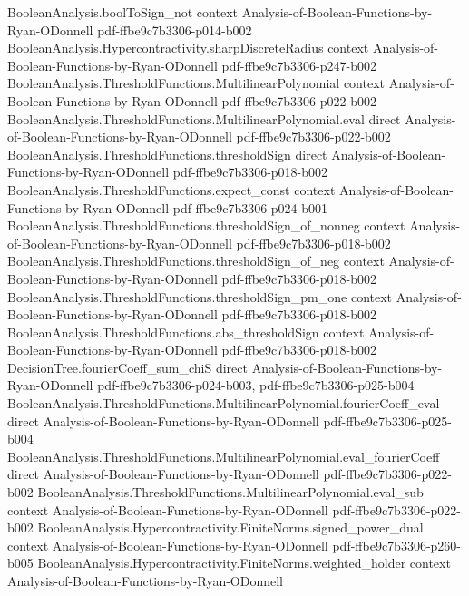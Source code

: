 \begin{theorem}
\proofstep
  {BooleanAnalysis.boolToSign_not}
  {context}
  {Analysis-of-Boolean-Functions-by-Ryan-ODonnell}
  {pdf-ffbe9c7b3306-p014-b002}
\proofstep
  {BooleanAnalysis.Hypercontractivity.sharpDiscreteRadius}
  {context}
  {Analysis-of-Boolean-Functions-by-Ryan-ODonnell}
  {pdf-ffbe9c7b3306-p247-b002}
\proofstep
  {BooleanAnalysis.ThresholdFunctions.MultilinearPolynomial}
  {context}
  {Analysis-of-Boolean-Functions-by-Ryan-ODonnell}
  {pdf-ffbe9c7b3306-p022-b002}
\proofstep
  {BooleanAnalysis.ThresholdFunctions.MultilinearPolynomial.eval}
  {direct}
  {Analysis-of-Boolean-Functions-by-Ryan-ODonnell}
  {pdf-ffbe9c7b3306-p022-b002}
\proofstep
  {BooleanAnalysis.ThresholdFunctions.thresholdSign}
  {direct}
  {Analysis-of-Boolean-Functions-by-Ryan-ODonnell}
  {pdf-ffbe9c7b3306-p018-b002}
\proofstep
  {BooleanAnalysis.ThresholdFunctions.expect_const}
  {context}
  {Analysis-of-Boolean-Functions-by-Ryan-ODonnell}
  {pdf-ffbe9c7b3306-p024-b001}
\proofstep
  {BooleanAnalysis.ThresholdFunctions.thresholdSign_of_nonneg}
  {context}
  {Analysis-of-Boolean-Functions-by-Ryan-ODonnell}
  {pdf-ffbe9c7b3306-p018-b002}
\proofstep
  {BooleanAnalysis.ThresholdFunctions.thresholdSign_of_neg}
  {context}
  {Analysis-of-Boolean-Functions-by-Ryan-ODonnell}
  {pdf-ffbe9c7b3306-p018-b002}
\proofstep
  {BooleanAnalysis.ThresholdFunctions.thresholdSign_pm_one}
  {context}
  {Analysis-of-Boolean-Functions-by-Ryan-ODonnell}
  {pdf-ffbe9c7b3306-p018-b002}
\proofstep
  {BooleanAnalysis.ThresholdFunctions.abs_thresholdSign}
  {context}
  {Analysis-of-Boolean-Functions-by-Ryan-ODonnell}
  {pdf-ffbe9c7b3306-p018-b002}
\proofstep
  {DecisionTree.fourierCoeff_sum_chiS}
  {direct}
  {Analysis-of-Boolean-Functions-by-Ryan-ODonnell}
  {pdf-ffbe9c7b3306-p024-b003,
    pdf-ffbe9c7b3306-p025-b004}
\proofstep
  {BooleanAnalysis.ThresholdFunctions.MultilinearPolynomial.fourierCoeff_eval}
  {direct}
  {Analysis-of-Boolean-Functions-by-Ryan-ODonnell}
  {pdf-ffbe9c7b3306-p025-b004}
\proofstep
  {BooleanAnalysis.ThresholdFunctions.MultilinearPolynomial.eval_fourierCoeff}
  {direct}
  {Analysis-of-Boolean-Functions-by-Ryan-ODonnell}
  {pdf-ffbe9c7b3306-p022-b002}
\proofstep
  {BooleanAnalysis.ThresholdFunctions.MultilinearPolynomial.eval_sub}
  {context}
  {Analysis-of-Boolean-Functions-by-Ryan-ODonnell}
  {pdf-ffbe9c7b3306-p022-b002}
\proofstep
  {BooleanAnalysis.Hypercontractivity.FiniteNorms.signed_power_dual}
  {context}
  {Analysis-of-Boolean-Functions-by-Ryan-ODonnell}
  {pdf-ffbe9c7b3306-p260-b005}
\proofstep
  {BooleanAnalysis.Hypercontractivity.FiniteNorms.weighted_holder}
  {context}
  {Analysis-of-Boolean-Functions-by-Ryan-ODonnell}

\end{theorem}
